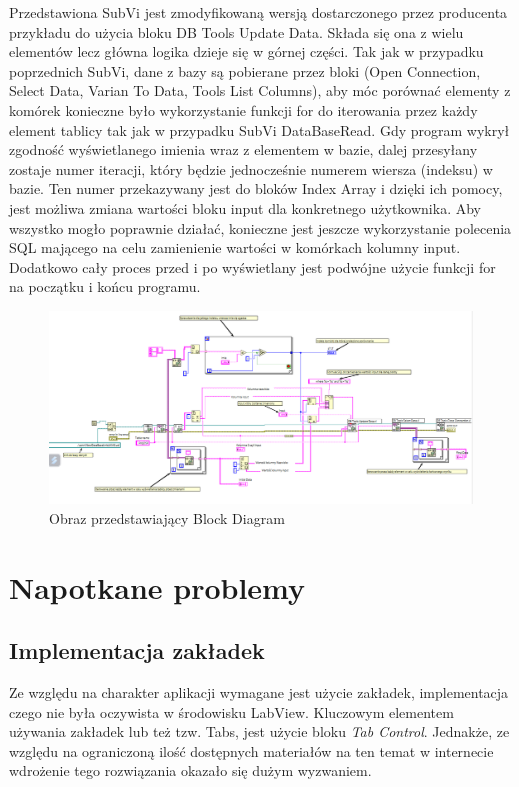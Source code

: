 \documentclass{report}
\begin{document}
Przedstawiona SubVi jest zmodyfikowaną wersją dostarczonego przez producenta przykładu do użycia bloku DB Tools Update Data. Składa się ona z wielu elementów lecz główna logika dzieje się w górnej części.
Tak jak w przypadku poprzednich SubVi, dane z bazy są pobierane przez bloki (Open Connection, Select Data, Varian To Data, Tools List Columns), aby móc porównać elementy z komórek konieczne było wykorzystanie
funkcji for do iterowania przez każdy element tablicy tak jak w przypadku SubVi DataBaseRead. Gdy program wykrył zgodność wyświetlanego imienia wraz z elementem w bazie, dalej przesyłany zostaje numer iteracji,
który będzie jednocześnie numerem wiersza (indeksu) w bazie. Ten numer przekazywany jest do bloków Index Array i dzięki ich pomocy, jest możliwa zmiana wartości bloku input dla konkretnego użytkownika.
Aby wszystko mogło poprawnie działać, konieczne jest jeszcze wykorzystanie polecenia SQL mającego na celu zamienienie wartości w komórkach kolumny input.
Dodatkowo cały proces przed i po wyświetlany jest podwójne użycie funkcji for na początku i końcu programu.

\begin{figure}[H]
    \centering
    \includegraphics[width=1.0\textwidth]{src/Database/Database_update_subvi.png}
    \caption{Obraz przedstawiający Block Diagram}
    \label{fig:first-att}
\end{figure}

\section{\LARGE Napotkane problemy}
\subsection{\Large Implementacja zakładek}

Ze względu na charakter aplikacji wymagane jest użycie zakładek, implementacja czego nie była oczywista w środowisku LabView. Kluczowym elementem używania zakładek lub też tzw. Tabs, jest użycie bloku \textit{Tab Control}. Jednakże, ze względu na ograniczoną ilość dostępnych materiałów na ten temat w internecie wdrożenie tego rozwiązania okazało się dużym wyzwaniem. 
\end{document}
